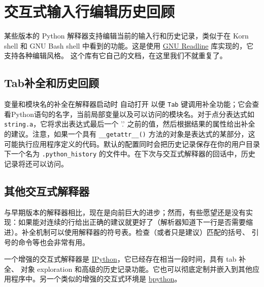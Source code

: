 \chapter{交互式输入行编辑历史回顾\label{EditAndHistory}}
某些版本的 Python 解释器支持编辑当前的输入行和历史记录，类似于在 Korn shell 和 GNU Bash shell 中看到的功能。这是使用 \href{https://tiswww.case.edu/php/chet/readline/rltop.html}{GNU Readline} 库实现的，它支持各种编辑风格。 这个库有它自己的文档，在这里我们不就重复了。
\section{Tab补全和历史回顾}
变量和模块名的补全在解释器启动时 自动打开 以便 \texttt{Tab} 键调用补全功能；它会查看Python语句的名字，当前局部变量以及可以访问的模块名。对于点分表达式如 \texttt{string.a}，它将求出表达式最后一个 '.' 之前的值，然后根据结果的属性给出补全的建议。注意，如果一个具有 \verb|__getattr__()| 方法的对象是表达式的某部分，这可能执行应用程序定义的代码。默认的配置同时会把历史记录保存在你的用户目录下一个名为 \verb|.python_history| 的文件中。在下次与交互式解释器的回话中，历史记录将还可以访问。
\section{其他交互式解释器}
与早期版本的解释器相比，现在是向前巨大的进步；然而，有些愿望还是没有实现：如果能对连续的行给出正确的建议就更好了（解析器知道下一行是否需要缩进）。补全机制可以使用解释器的符号表。检查（或者只是建议）匹配的括号、 引号的命令等也会非常有用。

一个增强的交互式解释器是 \href{https://ipython.org/}{IPython}，它已经存在相当一段时间，具有 tab 补全、 对象 exploration 和高级的历史记录功能。它也可以彻底定制并嵌入到其他应用程序中。另一个类似的增强的交互式环境是 \href{https://www.bpython-interpreter.org}{bpython}。 